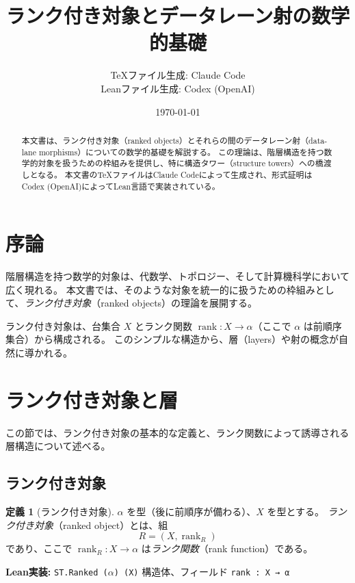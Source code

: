\documentclass[a4paper,12pt]{ltjsarticle}
\title{ランク付き対象とデータレーン射の数学的基礎}
\author{%
  TeXファイル生成: Claude Code \\
  Leanファイル生成: Codex (OpenAI)%
}
\date{\today}
\theoremstyle{definition}
\newtheorem{definition}{定義}[section]
\begin{document}
\maketitle

\begin{abstract}
本文書は、ランク付き対象（ranked objects）とそれらの間のデータレーン射（data-lane morphisms）についての数学的基礎を解説する。
この理論は、階層構造を持つ数学的対象を扱うための枠組みを提供し、特に構造タワー（structure towers）への橋渡しとなる。
本文書のTeXファイルはClaude Codeによって生成され、形式証明はCodex (OpenAI)によってLean言語で実装されている。
\end{abstract}

\tableofcontents

\section{序論}

階層構造を持つ数学的対象は、代数学、トポロジー、そして計算機科学において広く現れる。
本文書では、そのような対象を統一的に扱うための枠組みとして、\emph{ランク付き対象}（ranked objects）の理論を展開する。

ランク付き対象は、台集合 $X$ とランク関数 $\operatorname{rank} : X \to \alpha$（ここで $\alpha$ は前順序集合）から構成される。
このシンプルな構造から、層（layers）や射の概念が自然に導かれる。

\section{ランク付き対象と層}
\label{sec:rankcore}

この節では、ランク付き対象の基本的な定義と、ランク関数によって誘導される層構造について述べる。

\subsection{ランク付き対象}

\begin{definition}[ランク付き対象]
\label{def:ranked}
$\alpha$ を型（後に前順序が備わる）、$X$ を型とする。
\emph{ランク付き対象}（ranked object）とは、組
\[
  R = (X, \operatorname{rank}_R)
\]
であり、ここで $\operatorname{rank}_R : X \to \alpha$ は\emph{ランク関数}（rank function）である。

\textbf{Lean実装:} \texttt{ST.Ranked (\(\alpha\)) (X)} 構造体、フィールド \texttt{rank : X → α}
\end{definition}
\end{document}

